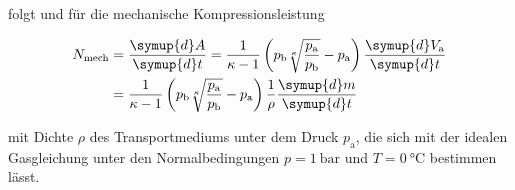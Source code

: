 folgt und für die mechanische Kompressionsleistung

\begin{equation}
    \begin{split}
        N_\text{mech} &= \frac{\symup{d}A}{\symup{d}t} = \frac{1}{\kappa - 1}
        \left(p_\text{b} \sqrt[\kappa]{ \frac{p_\text{a}}{p_\text{b}}} 
        - p_\text{a} \right) \frac{\symup{d}V_\text{a}}{\symup{d}t} \\
        &= \frac{1}{\kappa - 1} \left(p_\text{b} \sqrt[\kappa]{ 
        \frac{p_\text{a}}{p_\text{b}}} - p_\text{a}\right) \frac{1}{\rho}
        \frac{\symup{d}m}{\symup{d}t}
    \end{split}
\end{equation}

mit Dichte $\rho$ des Transportmediums unter  dem Druck $p_\text{a}$, die sich
mit der idealen Gasgleichung unter den Normalbedingungen $p = \SI{1}{\bar}$ und
$T = \SI{0}{\celsius}$ bestimmen lässt.








